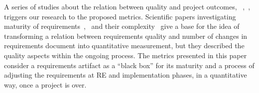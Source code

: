 A series of studies about the relation between quality and project outcomes, ~\cite{Verner:2005},~\cite{Kamata:2007},~\cite{Noorwali:2015} triggers our research to the proposed metrics. Scientific papers investigating maturity of requirements~\cite{Basili:1981},~\cite{FARBEY:1990} and their complexity~\cite{Antinyan:2016} give a base for the idea of transforming a relation between requirements quality and number of changes in requirements document into quantitative measurement, but they described the quality aspects within the ongoing process. The metrics presented in this paper consider a requirements artifact as a ``black box'' for its maturity and a process of adjusting the requirements at RE and implementation phases, in a quantitative way, once a project is over.

%
%
%
